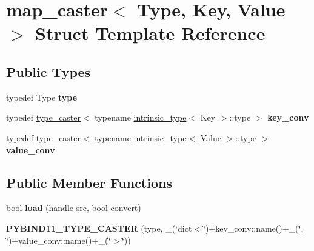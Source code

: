 \hypertarget{structmap__caster}{}\section{map\+\_\+caster$<$ Type, Key, Value $>$ Struct Template Reference}
\label{structmap__caster}
\subsection*{Public Types}
\begin{DoxyCompactItemize}
\item 
typedef Type {\bfseries type}\hypertarget{structmap__caster_acde8e6719b82c2b4092ddb54a6fd9b2c}{}\label{structmap__caster_acde8e6719b82c2b4092ddb54a6fd9b2c}

\item 
typedef \hyperlink{classtype__caster}{type\+\_\+caster}$<$ typename \hyperlink{structintrinsic__type}{intrinsic\+\_\+type}$<$ Key $>$\+::type $>$ {\bfseries key\+\_\+conv}\hypertarget{structmap__caster_a19f6c22a194b962b23fd5a4b637adf43}{}\label{structmap__caster_a19f6c22a194b962b23fd5a4b637adf43}

\item 
typedef \hyperlink{classtype__caster}{type\+\_\+caster}$<$ typename \hyperlink{structintrinsic__type}{intrinsic\+\_\+type}$<$ Value $>$\+::type $>$ {\bfseries value\+\_\+conv}\hypertarget{structmap__caster_ace3d4a61055848c3548ff4bc1a2803f2}{}\label{structmap__caster_ace3d4a61055848c3548ff4bc1a2803f2}

\end{DoxyCompactItemize}
\subsection*{Public Member Functions}
\begin{DoxyCompactItemize}
\item 
bool {\bfseries load} (\hyperlink{classhandle}{handle} src, bool convert)\hypertarget{structmap__caster_aa35d07c2fcaf64c021da0bff1f710992}{}\label{structmap__caster_aa35d07c2fcaf64c021da0bff1f710992}

\item 
{\bfseries P\+Y\+B\+I\+N\+D11\+\_\+\+T\+Y\+P\+E\+\_\+\+C\+A\+S\+T\+ER} (type, \+\_\+(\char`\"{}dict$<$\char`\"{})+key\+\_\+conv\+::name()+\+\_\+(\char`\"{}, \char`\"{})+value\+\_\+conv\+::name()+\+\_\+(\char`\"{}$>$\char`\"{}))\hypertarget{structmap__caster_af45c1807f4ceef7cf0bd6cbe0013340a}{}\label{structmap__caster_af45c1807f4ceef7cf0bd6cbe0013340a}

\end{DoxyCompactItemize}
